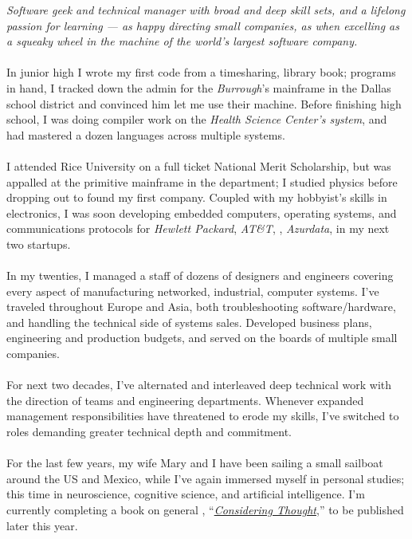 \documentclass[10pt,a4paper]{article}
\begin{document}
\vspace{-1.3em}  %
\begin{multicols}{2}  %
\noindent \emph{Software geek and technical manager with broad and deep skill sets, and a lifelong passion for learning --- as happy directing small companies, as when excelling as a squeaky wheel in the machine of the world's largest software company.}
\\
\\
In junior high I wrote my first code from a \textit{} timesharing, library book; programs in hand, I tracked down the admin for the \textit{Burrough}'s mainframe in the Dallas school district and convinced him let me use their machine. Before finishing high school, I was doing compiler work on the \textit{ Health Science Center's system}, and had mastered a dozen languages across multiple systems.
\\
\\
I attended Rice University on a full ticket National Merit Scholarship, but was appalled at the primitive  mainframe in the  department; I studied physics before dropping out to found my first company. Coupled with my hobbyist's skills in electronics, I was soon developing embedded computers, operating systems, and communications protocols for \textit{Hewlett Packard}, \textit{AT\&T}, \textit{}, \textit{Azurdata}, in my next two startups.
\\
\\
In my twenties, I managed a staff of dozens of designers and engineers covering every aspect of manufacturing networked, industrial, computer systems. I've traveled throughout Europe and Asia, both troubleshooting software/hardware, and handling the technical side of systems sales. Developed business plans, engineering and production budgets, and served on the boards of multiple small companies.
\\
\\
For next two decades, I've alternated and interleaved deep technical work with the direction of teams and engineering departments. Whenever expanded management responsibilities have threatened to erode my skills, I've switched to roles demanding greater technical depth and commitment.
\\
\\
For the last few years, my wife Mary and I have been sailing a small sailboat around the US and Mexico, while I've again immersed myself in personal studies; this time in neuroscience, cognitive science, and artificial intelligence. I'm currently completing  a book on general , ``\href{http://consideringthought.com/}{\textit{Considering Thought}},'' to be published later this year.

\end{multicols}
\end{document}
